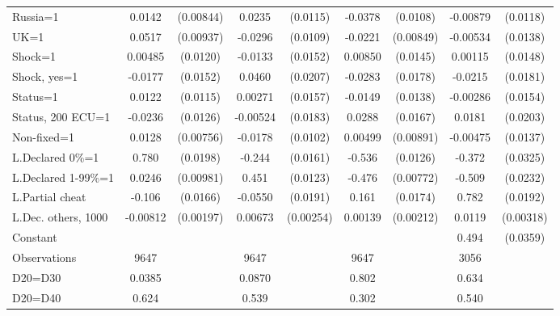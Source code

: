 \begin{tabular}{l|cccccc|cc}
Russia=1        &   0.0142\sym{*}  &(0.00844)&   0.0235\sym{**} & (0.0115)&  -0.0378\sym{***}& (0.0108)& -0.00879         & (0.0118)\\
UK=1            &   0.0517\sym{***}&(0.00937)&  -0.0296\sym{***}& (0.0109)&  -0.0221\sym{***}&(0.00849)& -0.00534         & (0.0138)\\
Shock=1         &  0.00485         & (0.0120)&  -0.0133         & (0.0152)&  0.00850         & (0.0145)&  0.00115         & (0.0148)\\
Shock, yes=1    &  -0.0177         & (0.0152)&   0.0460\sym{**} & (0.0207)&  -0.0283         & (0.0178)&  -0.0215         & (0.0181)\\
Status=1        &   0.0122         & (0.0115)&  0.00271         & (0.0157)&  -0.0149         & (0.0138)& -0.00286         & (0.0154)\\
Status, 200 ECU=1&  -0.0236\sym{*}  & (0.0126)& -0.00524         & (0.0183)&   0.0288\sym{*}  & (0.0167)&   0.0181         & (0.0203)\\
Non-fixed=1     &   0.0128\sym{*}  &(0.00756)&  -0.0178\sym{*}  & (0.0102)&  0.00499         &(0.00891)& -0.00475         & (0.0137)\\
L.Declared 0\%=1&    0.780\sym{***}& (0.0198)&   -0.244\sym{***}& (0.0161)&   -0.536\sym{***}& (0.0126)&   -0.372\sym{***}& (0.0325)\\
L.Declared 1-99\%=1&   0.0246\sym{**} &(0.00981)&    0.451\sym{***}& (0.0123)&   -0.476\sym{***}&(0.00772)&   -0.509\sym{***}& (0.0232)\\
L.Partial cheat &   -0.106\sym{***}& (0.0166)&  -0.0550\sym{***}& (0.0191)&    0.161\sym{***}& (0.0174)&    0.782\sym{***}& (0.0192)\\
L.Dec. others, 1000& -0.00812\sym{***}&(0.00197)&  0.00673\sym{***}&(0.00254)&  0.00139         &(0.00212)&   0.0119\sym{***}&(0.00318)\\
Constant        &                  &         &                  &         &                  &         &    0.494\sym{***}& (0.0359)\\
\hline
Observations    &     9647         &         &     9647         &         &     9647         &         &     3056         &         \\
D20=D30         &   0.0385         &         &   0.0870         &         &    0.802         &         &    0.634         &         \\
D20=D40         &    0.624         &         &    0.539         &         &    0.302         &         &    0.540         &         \\

\end{tabular}
